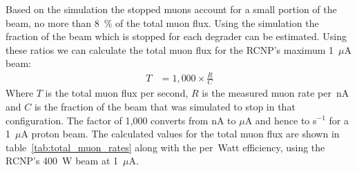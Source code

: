 Based on the simulation the stopped muons account for a small portion of the beam, no more than 8~\% of the total muon flux. Using the simulation the fraction of the beam which is stopped for each degrader can be estimated. Using these ratios we can calculate the total muon flux for the RCNP's maximum 1~\(\mu\)A beam:
\begin{align}\label{equ:total_rate}
  T &= 1,000\times\frac{R}{C}
\end{align}
Where \(T\) is the total muon flux per second, \(R\) is the measured muon rate per~nA and \(C\) is the fraction of the beam that was simulated to stop in that configuration. The factor of 1,000 converts from nA to \(\mu\)A and hence to s\(^{-1}\) for a 1~\(\mu\)A proton beam. The calculated values for the total muon flux are shown in table~\ref{tab:total_muon_rates} along with the per~Watt efficiency, using the RCNP's 400~W beam at 1~\(\mu\)A.


